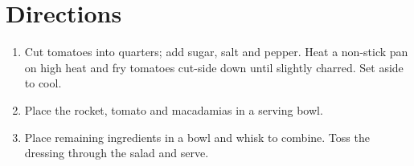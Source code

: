 \section*{Directions}
\begin{enumerate}
	\item Cut tomatoes into quarters; add sugar, salt and pepper. Heat a non-stick pan on high heat and fry tomatoes cut-side down until slightly charred. Set aside to cool.
	\item Place the rocket, tomato and macadamias in a serving bowl.
	\item  Place remaining ingredients in a bowl and whisk to combine. Toss the dressing through the salad and serve.
\end{enumerate}


\bigskip
